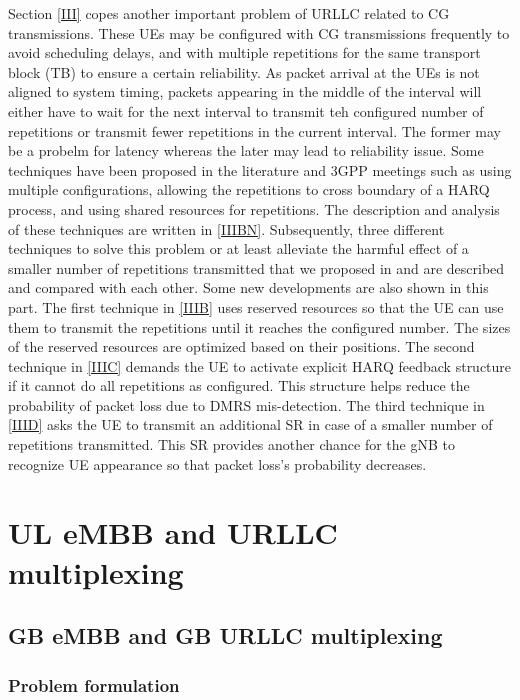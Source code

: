 \documentclass{ieeeaccess}
\begin{document}
Section \ref{III} copes another important problem of URLLC related to CG transmissions. These UEs may be configured with CG transmissions frequently to avoid scheduling delays, and with multiple repetitions for the same transport block (TB) to ensure a certain reliability. As packet arrival at the UEs is not aligned to system timing, packets appearing in the middle of the interval will either have to wait for the next interval to transmit teh configured number of repetitions or transmit fewer repetitions in the current interval. The former may be a probelm for latency whereas the later may lead to reliability issue. Some techniques have been proposed in the literature and 3GPP meetings such as using multiple configurations, allowing the repetitions to cross boundary of a HARQ process, and using shared resources for repetitions. The description and analysis of these techniques are written in \ref{IIIBN}. Subsequently, three different techniques to solve this problem or at least alleviate the harmful effect of a smaller number of repetitions transmitted that we proposed in \cite{b9} and \cite{ad100} are described and compared with each other. Some new developments are also shown in this part. The first technique in \ref{IIIB} uses reserved resources so that the UE can use them to transmit the repetitions until it reaches the configured number. The sizes of the reserved resources are optimized based on their positions. The second technique in \ref{IIIC} demands the UE to activate explicit HARQ feedback structure if it cannot do all repetitions as configured. This structure helps reduce the probability of packet loss due to DMRS mis-detection. The third technique in \ref{IIID} asks the UE to transmit an additional SR in case of a smaller number of repetitions transmitted. This SR provides another chance for the gNB to recognize UE appearance so that packet loss's probability decreases. 

\section{UL eMBB and URLLC multiplexing}\label{II}
\subsection{GB eMBB and GB URLLC multiplexing} \label{IIA}
\subsubsection{Problem formulation}\label{IIA1}
\end{document}
